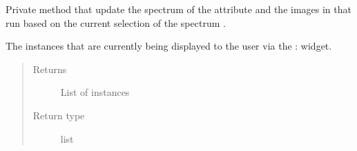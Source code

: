 \documentclass[letterpaper,10pt,english]{sphinxmanual}
\begin{document}
\begin{fulllineitems}
\begin{fulllineitems}
\end{fulllineitems}


\begin{fulllineitems}
\label{\detokenize{polo.windows:polo.windows.run_updater_dialog.RunUpdaterDialog._update_spectrum}}
Private method that update the spectrum of the {\hyperref[\detokenize{polo.windows:polo.windows.run_updater_dialog.RunUpdaterDialog.run}]{}} attribute 
and the images in that run based on the current selection of the 
spectrum  .

\end{fulllineitems}


\begin{fulllineitems}
\label{\detokenize{polo.windows:polo.windows.run_updater_dialog.RunUpdaterDialog.current_menus}}
The {\hyperref[\detokenize{polo.utils:polo.utils.io_utils.Menu}]{}} instances that are currently being displayed
to the user via the {\hyperref[\detokenize{polo.utils:polo.utils.io_utils.Menu}]{}} : widget.
\begin{quote}\begin{description}
\item[{Returns}] \leavevmode
List of {\hyperref[\detokenize{polo.utils:polo.utils.io_utils.Menu}]{}} instances

\item[{Return type}] \leavevmode
list

\end{description}\end{quote}

\end{fulllineitems}


\end{fulllineitems}
\end{document}
